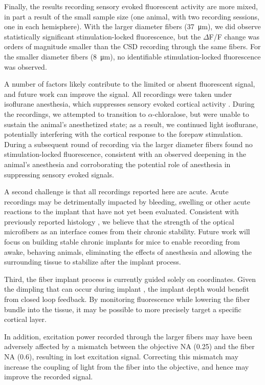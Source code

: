 Finally, the results recording sensory evoked fluorescent activity are
 more mixed, in part a result of the small sample size (one animal, 
with two recording sessions, one in each hemisphere). With the larger 
diameter fibers (37~\si{\micro\meter}), we did observe statistically 
significant stimulation-locked fluorescence, but the $\Delta$F/F 
change was orders of magnitude smaller than the CSD recording through 
the same fibers. For the smaller diameter fibers 
(8~\si{\micro\meter}), no identifiable stimulation-locked fluorescence
 was observed.

A number of factors likely contribute to the limited or absent 
fluorescent signal, and future work can improve the signal. All 
recordings were taken under isoflurane anesthesia, which suppresses 
sensory evoked cortical activity \cite{Sitdikova:2013fn}. During the 
recordings, we attempted to transition to $\alpha$-chloralose, but were 
unable to sustain the animal's anesthetized state; as a result, we 
continued light isoflurane, potentially interfering with the cortical 
response to the forepaw stimulation. During a subsequent round of 
recording via the larger diameter fibers found no stimulation-locked 
fluorescence, consistent with an observed deepening in the animal's 
anesthesia and corroborating the potential role of anesthesia in 
suppressing sensory evoked signals.

A second challenge is that all recordings reported here are acute. 
Acute recordings may be detrimentally impacted by bleeding, swelling 
or other acute reactions to the implant that have not yet been 
evaluated. Consistent with previously reported histology 
\cite{Perkins:2018ae}, we believe that the strength of the optical 
microfibers as an interface comes from their chronic stability. Future
 work will focus on building stable chronic implants for mice to 
enable recording from awake, behaving animals, eliminating the effects
 of anesthesia and allowing the surrounding tissue to stabilize after 
the implant process.

Third, the fiber implant process is currently guided solely on 
coordinates. Given the dimpling that can occur during implant 
\cite{Perkins:2018ae}, the implant depth would benefit from closed 
loop feedback. By monitoring fluorescence while lowering the fiber 
bundle into the tissue, it may be possible to more precisely target a 
specific cortical layer.

In addition, excitation power recorded through the larger fibers may 
have been adversely affected by a mismatch between the objective NA 
(0.25) and the fiber NA (0.6), resulting in lost excitation signal. 
Correcting this mismatch may increase the coupling of light from the 
fiber into the objective, and hence may improve the recorded signal.

